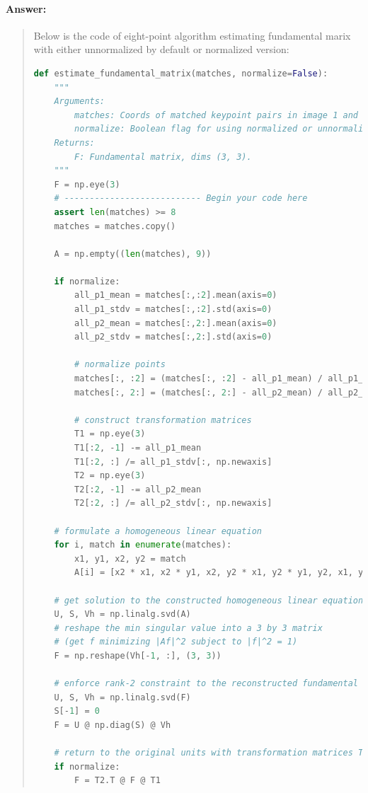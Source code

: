 \documentclass[11pt]{article}
\begin{document}
\paragraph{Answer:} 
\begin{quote}
Below is the code of eight-point algorithm estimating fundamental marix with either unnormalized by default or normalized version:

\begin{lstlisting}[language=Python, basicstyle=\scriptsize]
    def estimate_fundamental_matrix(matches, normalize=False):
    """
    Arguments:
        matches: Coords of matched keypoint pairs in image 1 and 2, dims (#matches, 4).
        normalize: Boolean flag for using normalized or unnormalized alg.
    Returns:
        F: Fundamental matrix, dims (3, 3).
    """
    F = np.eye(3)
    # --------------------------- Begin your code here
    assert len(matches) >= 8
    matches = matches.copy()

    A = np.empty((len(matches), 9))

    if normalize:
        all_p1_mean = matches[:,:2].mean(axis=0)
        all_p1_stdv = matches[:,:2].std(axis=0)
        all_p2_mean = matches[:,2:].mean(axis=0)
        all_p2_stdv = matches[:,2:].std(axis=0)

        # normalize points
        matches[:, :2] = (matches[:, :2] - all_p1_mean) / all_p1_stdv
        matches[:, 2:] = (matches[:, 2:] - all_p2_mean) / all_p2_stdv

        # construct transformation matrices
        T1 = np.eye(3)
        T1[:2, -1] -= all_p1_mean
        T1[:2, :] /= all_p1_stdv[:, np.newaxis]
        T2 = np.eye(3)
        T2[:2, -1] -= all_p2_mean
        T2[:2, :] /= all_p2_stdv[:, np.newaxis]
        
    # formulate a homogeneous linear equation
    for i, match in enumerate(matches):
        x1, y1, x2, y2 = match
        A[i] = [x2 * x1, x2 * y1, x2, y2 * x1, y2 * y1, y2, x1, y1, 1]
    
    # get solution to the constructed homogeneous linear equation (in the form of Af = 0)
    U, S, Vh = np.linalg.svd(A)
    # reshape the min singular value into a 3 by 3 matrix
    # (get f minimizing |Af|^2 subject to |f|^2 = 1)
    F = np.reshape(Vh[-1, :], (3, 3))   

    # enforce rank-2 constraint to the reconstructed fundamental matrix F
    U, S, Vh = np.linalg.svd(F)
    S[-1] = 0
    F = U @ np.diag(S) @ Vh
    
    # return to the original units with transformation matrices T1 and T2
    if normalize:
        F = T2.T @ F @ T1


\end{lstlisting}
\end{quote}
\end{document}
